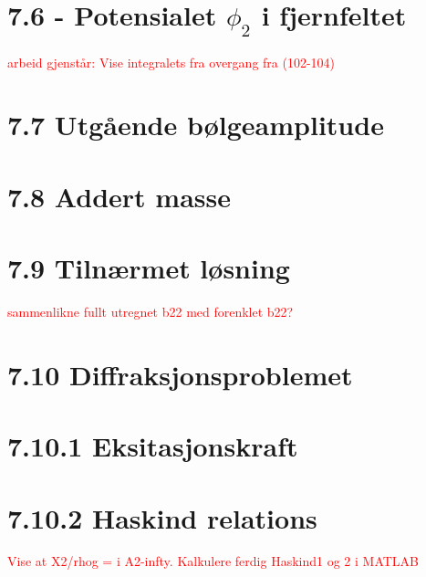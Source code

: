 \documentclass{article}
\begin{document}
\section{7.6 - Potensialet $\phi_2$ i fjernfeltet}

\textcolor{red}{arbeid gjenstår: Vise integralets fra overgang fra (102-104)}
\section{7.7 Utgående bølgeamplitude}


\section{7.8 Addert masse}


\section{7.9 Tilnærmet løsning}

\textcolor{red}{sammenlikne fullt utregnet b22 med forenklet b22?}
 
 
\section{7.10 Diffraksjonsproblemet}


\section{7.10.1 Eksitasjonskraft }


\section{7.10.2 Haskind relations}

\textcolor{red}{Vise at X2/rhog = i A2-infty. Kalkulere ferdig Haskind1 og 2 i MATLAB}
\end{document}
